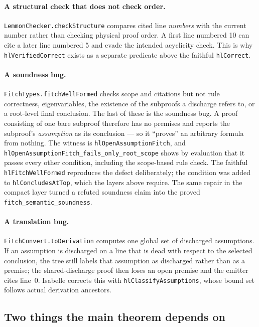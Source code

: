 \documentclass[11pt]{article}
\theoremstyle{plain}
\newcommand{\ubrk}{\_\discretionary{}{}{}}
\newcommand{\isa}[1]{\textup{\texttt{\small #1}}}
\begin{document}
\paragraph{A structural check that does not check order.}
\isa{LemmonChecker.checkStructure} compares cited line \emph{numbers} with the
current number rather than checking physical proof order. A first line numbered
10 can cite a later line numbered 5 and evade the intended acyclicity check.
This is why \isa{hlVerifiedCorrect} exists as a separate predicate above the
faithful \isa{hlCorrect}.

\paragraph{A soundness bug.}
\isa{FitchTypes.fitchWellFormed} checks scope and citations but not rule
correctness, eigenvariables, the existence of the subproofs a discharge refers
to, or a root-level final conclusion. The last of these is the soundness bug. A proof consisting of one bare subproof therefore has no
premises and reports the subproof's \emph{assumption} as its conclusion --- so
it ``proves'' an arbitrary formula from nothing. The witness is
\isa{hlOpenAssumptionFitch}, and \isa{hlOpenAssumptionFitch\ubrk{}fails\ubrk{}only\ubrk{}root\ubrk{}scope}
shows by evaluation that it passes every other condition, including the
scope-based rule check. The faithful \isa{hlFitchWellFormed} reproduces the
defect deliberately; the condition was added to \isa{hlConcludesAtTop}, which
the layers above require. The same repair in the compact layer turned a refuted
soundness claim into the proved \isa{fitch\ubrk{}semantic\ubrk{}soundness}.

\paragraph{A translation bug.}
\isa{FitchConvert.toDerivation} computes one global set of discharged
assumptions. If an assumption is discharged on a line that is dead with respect
to the selected conclusion, the tree still labels that assumption as discharged
rather than as a premise; the shared-discharge proof then loses an open premise
and the emitter cites line~0. Isabelle corrects this with
\isa{hlClassifyAssumptions}, whose bound set follows actual derivation
ancestors.

\subsection{Two things the main theorem depends on}
\end{document}
